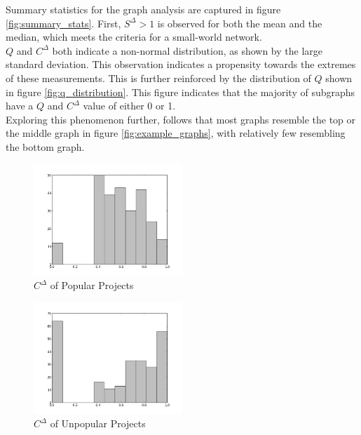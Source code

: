 \documentclass{proc}
\begin{document}


Summary statistics for the graph analysis are captured in figure \ref{fig:summary_stats}. First, $S^\Delta > 1$ is observed for both the mean and the median, which meets the criteria for a small-world network\cite{humphries2008network}.\\

$Q$ and $C^\Delta$ both indicate a non-normal distribution, as shown by the large standard deviation. This observation indicates a propensity towards the extremes of these measurements. This is further reinforced by the distribution of $Q$ shown in figure \ref{fig:q_distribution}. This figure indicates that the majority of subgraphs have a $Q$ and $C^\Delta$ value of either 0 or 1.\\

Exploring this phenomenon further, follows that most graphs resemble the top or the middle graph in figure \ref{fig:example_graphs}, with relatively few resembling the bottom graph.


\begin{figure}
\label{fig:cc_popular}
\begin{center}
\caption{$C^\Delta$ of Popular Projects}
\includegraphics[width=0.5\textwidth]{images/freecode-popular.png}
\end{center}
\end{figure}

\begin{figure}
\begin{center}
\caption{$C^\Delta$ of Unpopular Projects}
\includegraphics[width=0.5\textwidth]{images/freecode-unpopular.png}
\end{center}
\end{figure}
\end{document}
